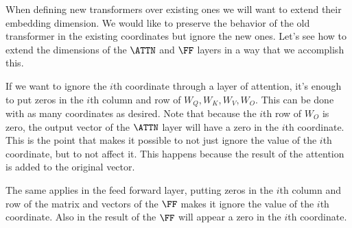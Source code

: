 When defining new transformers over existing ones we will want to extend their embedding dimension.
We would like to preserve the behavior of the old transformer in the existing coordinates but ignore the new ones.
Let's see how to extend the dimensions of the $\ATTN$ and $\FF$ layers in a way that we accomplish this.

If we want to ignore the $i$th coordinate through a layer of attention, it's enough to put zeros in the $i$th column and row of $W_Q, W_K, W_V, W_O$. This can be done with as many coordinates as desired. Note that because the $i$th row of $W_O$ is zero, the output vector of the $\ATTN$ layer will have a zero in the $i$th coordinate. This is the point that makes it possible to not just ignore the value of the $i$th coordinate, but to not affect it. This happens because the result of the attention is added to the original vector.

The same applies in the feed forward layer, putting zeros in the $i$th column and row of the matrix and vectors of the $\FF$ makes it ignore the value of the $i$th coordinate. Also in the result of the $\FF$ will appear a zero in the $i$th coordinate.
